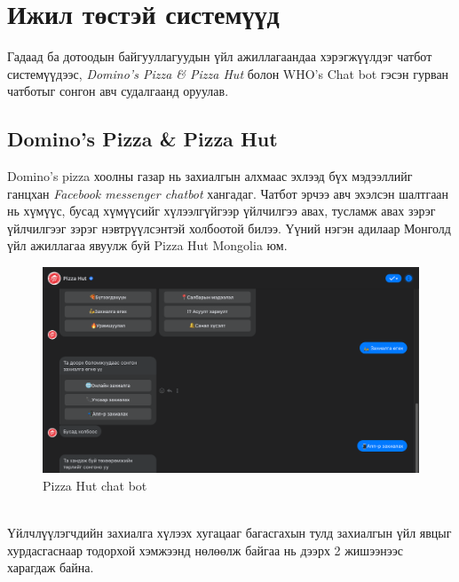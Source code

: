 \section{Ижил төстэй системүүд}
Гадаад ба дотоодын байгууллагуудын үйл ажиллагаандаа хэрэгжүүлдэг чатбот системүүдээс, \textit{Domino's Pizza \& Pizza Hut} болон {WHO's Chat bot} гэсэн гурван чатботыг сонгон авч судалгаанд оруулав. 
\subsection{Domino's Pizza \& Pizza Hut}
Domino's pizza хоолны газар нь захиалгын алхмаас эхлээд бүх мэдээллийг ганцхан \textit{Facebook messenger chatbot} хангадаг. Чатбот эрчээ авч эхэлсэн шалтгаан нь хүмүүс, бусад хүмүүсийг хүлээлгүйгээр үйлчилгээ авах, тусламж авах зэрэг үйлчилгээг зэрэг нэвтрүүлсэнтэй холбоотой билээ. Үүний нэгэн адилаар Монголд үйл ажиллагаа явуулж буй Pizza Hut Mongolia юм.
\begin{figure}[ht]
  \centering
  \includegraphics[width=\textwidth]{images/pizzaHut.png}
  \caption{Pizza Hut chat bot}\label{fig:chatbotPizzahut}
\end{figure}
\\Үйлчлүүлэгчдийн захиалга хүлээх хугацааг багасгахын тулд захиалгын үйл явцыг хурдасгаснаар тодорхой хэмжээнд нөлөөлж байгаа нь дээрх 2 жишээнээс харагдаж байна.

